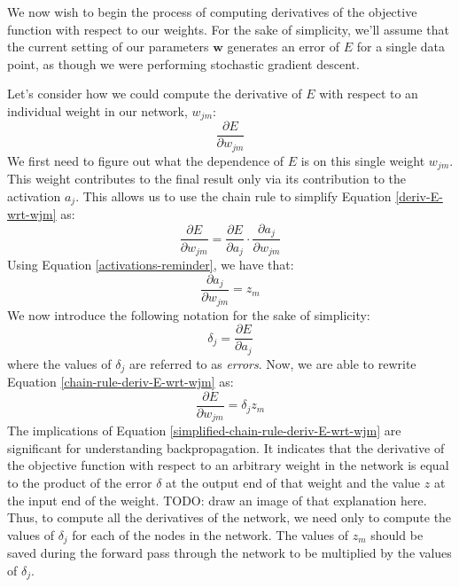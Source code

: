 We now wish to begin the process of computing derivatives of the objective function with respect to our weights. For the sake of simplicity, we'll assume that the current setting of our parameters $\textbf{w}$ generates an error of $E$ for a single data point, as though we were performing stochastic gradient descent.

Let's consider how we could compute the derivative of $E$ with respect to an individual weight in our network, $w_{jm}$:
\begin{equation} \label{deriv-E-wrt-wjm}
	\frac{\partial E}{\partial w_{jm}}
\end{equation}
We first need to figure out what the dependence of $E$ is on this single weight $w_{jm}$. This weight contributes to the final result only via its contribution to the activation $a_{j}$. This allows us to use the chain rule to simplify Equation \ref{deriv-E-wrt-wjm} as:
\begin{equation} \label{chain-rule-deriv-E-wrt-wjm}
	\frac{\partial E}{\partial w_{jm}} = \frac{\partial E}{\partial a_{j}} \cdot \frac{\partial a_{j}}{\partial w_{jm}}
\end{equation}
Using Equation \ref{activations-reminder}, we have that:
\begin{equation*}
	\frac{\partial a_{j}}{\partial w_{jm}} = z_{m}
\end{equation*}
We now introduce the following notation for the sake of simplicity:
\begin{equation} \label{delta-expression}
	\delta_{j} = \frac{\partial E}{\partial a_{j}}
\end{equation}
where the values of $\delta_{j}$ are referred to as \textit{errors}. Now, we are able to rewrite Equation \ref{chain-rule-deriv-E-wrt-wjm} as:
\begin{equation} \label{simplified-chain-rule-deriv-E-wrt-wjm}
	\frac{\partial E}{\partial w_{jm}} = \delta_{j} z_{m}
\end{equation}
The implications of Equation \ref{simplified-chain-rule-deriv-E-wrt-wjm} are significant for understanding backpropagation. It indicates that the derivative of the objective function with respect to an arbitrary weight in the network is equal to the product of the error $\delta$ at the output end of that weight and the value $z$ at the input end of the weight. TODO: draw an image of that explanation here. Thus, to compute all the derivatives of the network, we need only to compute the values of $\delta_{j}$ for each of the nodes in the network. The values of $z_{m}$ should be saved during the forward pass through the network to be multiplied by the values of $\delta_{j}$.
